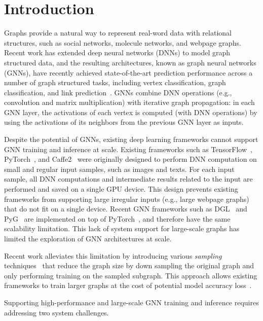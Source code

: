 \section{Introduction}
\label{sec:intro}
Graphs provide a natural way to represent real-word data with relational structures, such as social networks, molecule networks, and webpage graphs. 
Recent work has extended deep neural networks (DNNs) to model graph structured data, and the resulting architectures, known as graph neural networks (GNNs), have recently achieved state-of-the-art prediction performance across a number of graph structured tasks, including vertex classification, graph classification, and link prediction~\cite{GCN, GraphSAGE, DiffPool, GIN}.
GNNs combine DNN operations (e.g., convolution and matrix multiplication) with iterative graph propagation: in each GNN layer, the activations of each vertex is computed (with DNN operations) by using the activations of its neighbors from the previous GNN layer as inputs.

Despite the potential of GNNs, existing deep learning frameworks cannot support GNN training and inference at scale.
Existing frameworks such as TensorFlow~\cite{TensorFlow}, PyTorch~\cite{PyTorch}, and Caffe2~\cite{Caffe2} were originally designed to perform DNN computation on small and regular input samples, such as images and texts.
For each input sample, all DNN computations and intermediate results related to the input are performed and saved on a single GPU device.
This design prevents existing frameworks from supporting large irregular inputs (e.g., large webpage graphs) that do not fit on a single device.
%
Recent GNN frameworks such as DGL~\cite{DGL} and PyG~\cite{PyG} are implemented on top of PyTorch~\cite{PyTorch}, and therefore have the same scalability limitation.
%
This lack of system support for large-scale graphs has limited the exploration of GNN architectures at scale.

Recent work alleviates this limitation by introducing various {\em sampling} techniques~\cite{GraphSAGE, PinSAGE} that reduce the graph size by down sampling the original graph and only performing training on the sampled subgraph.
This approach allows existing frameworks to train larger graphs at the cost of potential model accuracy loss~\cite{GraphSAGE}.

Supporting high-performance and large-scale GNN training and inference requires addressing two system challenges.

